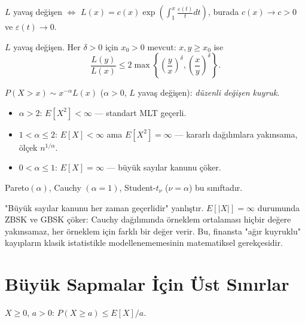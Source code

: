 \begin{teorem}\label{thm:karamata}
$L$ yavaş değişen $\iff$ $L(x)=c(x)\exp\!\left(\int_1^x \frac{\varepsilon(t)}{t}dt\right)$,
burada $c(x)\to c>0$ ve $\varepsilon(t)\to0$.
\end{teorem}

\begin{teorem}\label{thm:potter}
$L$ yavaş değişen. Her $\delta>0$ için $x_0>0$ mevcut:
$x,y\geq x_0$ ise
\[
  \frac{L(y)}{L(x)} \leq 2\max\!\left\{\left(\frac{y}{x}\right)^\delta, \left(\frac{x}{y}\right)^\delta\right\}.
\]
\end{teorem}

\begin{ornek}\label{ex:agir_kuyruk}
$P(X>x)\sim x^{-\alpha}L(x)$ ($\alpha>0$, $L$ yavaş değişen): \emph{düzenli değişen kuyruk}.
\begin{itemize}
  \item $\alpha>2$: $E[X^2]<\infty$ --- standart MLT geçerli.
  \item $1<\alpha\leq2$: $E[X]<\infty$ ama $E[X^2]=\infty$ --- kararlı dağılımlara yakınsama, ölçek $n^{1/\alpha}$.
  \item $0<\alpha\leq1$: $E[X]=\infty$ --- büyük sayılar kanunu çöker.
\end{itemize}
Pareto$(\alpha)$, Cauchy $(\alpha=1)$, Student-$t_\nu$ ($\nu=\alpha$) bu sınıftadır.
\end{ornek}

\begin{hataanalizi}
"Büyük sayılar kanunu her zaman geçerlidir" yanlıştır. $E[|X|]=\infty$ durumunda ZBSK ve GBSK çöker: Cauchy dağılımında örneklem ortalaması hiçbir değere yakınsamaz, her örneklem için farklı bir değer verir. Bu, finansta "ağır kuyruklu" kayıpların klasik istatistikle modellenememesinin matematiksel gerekçesidir.
\end{hataanalizi}

\section{Büyük Sapmalar İçin Üst Sınırlar}
\label{sec:buyuk_sapma_sinir}

\begin{teorem}\label{thm:markov_hatirlatma}
$X\geq0$, $a>0$: $P(X\geq a)\leq E[X]/a$.
\end{teorem}

